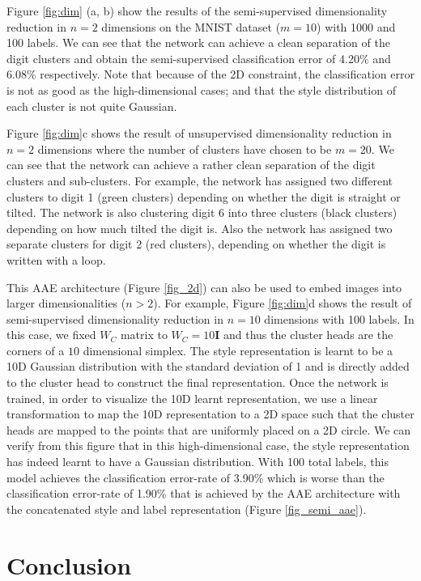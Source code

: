 \documentclass{article}
\begin{document}
Figure \ref{fig:dim} (a, b) show the results of the semi-supervised dimensionality reduction in $n=2$ dimensions on the MNIST dataset ($m=10$) with 1000 and 100 labels. We can see that the network can achieve a clean separation of the digit clusters and obtain the semi-supervised classification error of 4.20\% and 6.08\% respectively. Note that because of the 2D constraint, the classification error is not as good as the high-dimensional cases; and that the style distribution of each cluster is not quite Gaussian. 




Figure \ref{fig:dim}c shows the result of unsupervised dimensionality reduction in $n=2$ dimensions where the number of clusters have chosen to be $m=20$. We can see that the network can achieve a rather clean separation of the digit clusters and sub-clusters. For example, the network has assigned two different clusters to digit 1 (green clusters) depending on whether the digit is straight or tilted. The network is also clustering digit 6 into three clusters (black clusters) depending on how much tilted the digit is. Also the network has assigned two separate clusters for digit 2 (red clusters), depending on whether the digit is written with a loop.

This AAE architecture (Figure \ref{fig_2d}) can also be used to embed images into larger dimensionalities ($n>2$). For example, Figure \ref{fig:dim}d shows the result of semi-supervised dimensionality reduction in $n=10$ dimensions with 100 labels. In this case, we fixed $W_C$ matrix to $W_C = 10\mathbf{I}$ and thus the cluster heads are the corners of a $10$ dimensional simplex. The style representation is learnt to be a 10D Gaussian distribution with the standard deviation of 1 and is directly added to the cluster head to construct the final representation. Once the network is trained, in order to visualize the 10D learnt representation, we use a linear transformation to map the 10D representation to a 2D space such that the cluster heads are mapped to the points that are uniformly placed on a 2D circle. We can verify from this figure that in this high-dimensional case, the style representation has indeed learnt to have a Gaussian distribution. With 100 total labels, this model achieves the classification error-rate of 3.90\% which is worse than the classification error-rate of 1.90\% that is achieved by the AAE architecture with the concatenated style and label representation (Figure \ref{fig_semi_aae}).

\section{Conclusion}
\end{document}
